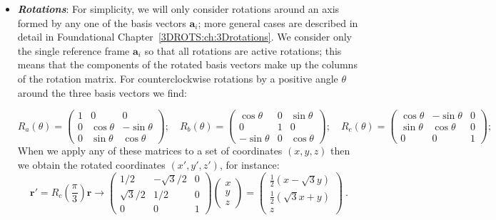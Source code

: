 \begin{itemize}
	 \item \textbf{\textit{Rotations}}: For simplicity, we will only consider rotations around an axis formed by any one of the basis vectors $\mathbf{a}_i$; more general cases are described in detail in Foundational Chapter~\ref{3DROTS:ch:3Drotations}. We consider only the single reference frame $\mathbf{a}_i$ so that all rotations are active rotations; this means that the components of the rotated basis vectors make up the columns of the rotation matrix. For counterclockwise rotations by a positive angle $\theta$ around the three basis vectors we find:
{\small\[
	R_a(\theta) = \begin{pmatrix}1&0&0\\ 0&\cos\theta&-\sin\theta\\ 0&\sin\theta&\cos\theta\end{pmatrix};\quad
	R_b(\theta) = \begin{pmatrix}\cos\theta&0&\sin\theta\\ 0&1&0\\ -\sin\theta&0&\cos\theta\end{pmatrix};\quad
	R_c(\theta) = \begin{pmatrix}\cos\theta&-\sin\theta&0\\ \sin\theta&\cos\theta&0\\ 0&0&1\end{pmatrix};\quad
 \]
When we apply any of these matrices to a set of coordinates $(x,y,z)$ then we obtain the rotated coordinates $(x',y',z')$, for instance:
\[
	\mathbf{r}'=R_c(\frac{\pi}{3})\mathbf{r}\rightarrow \begin{pmatrix}1/2&-\sqrt{3}/2&0\\ \sqrt{3}/2&1/2&0\\ 0&0&1\end{pmatrix}\begin{pmatrix}x\\ y\\ z\end{pmatrix}=\begin{pmatrix}\frac{1}{2}(x-\sqrt{3}y)\\ \frac{1}{2}(\sqrt{3}x+y)\\ z\end{pmatrix}\ .
\]

}
\end{itemize}
